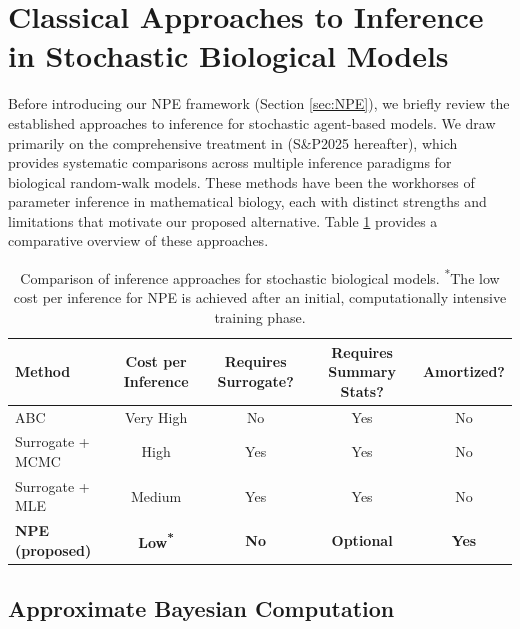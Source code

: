 \documentclass{article}
\newcommand{\SP}{S\&P2025 }
\begin{document}
\section{Classical Approaches to Inference in Stochastic Biological Models}\label{sec:classical_inference}
Before introducing our NPE framework (Section \ref{sec:NPE}), we briefly review the established approaches to inference for stochastic agent-based models. We draw primarily on the comprehensive treatment in \cite{Simpson2025.05.25.656057} (\SP hereafter), which provides systematic comparisons across multiple inference paradigms for biological random-walk models. These methods have been the workhorses of parameter inference in mathematical biology, each with distinct strengths and limitations that motivate our proposed alternative. Table \ref{tab:method_comparison} provides a comparative overview of these approaches.

\begin{table}[htbp]
	\centering
	\renewcommand{\arraystretch}{1.3} %
	\begin{tabular}{@{}lcccc@{}}
		\toprule
		\textbf{Method} & \textbf{Cost per Inference} & \textbf{Requires Surrogate?} & \textbf{Requires Summary Stats?} & \textbf{Amortized?} \\
		\midrule
		ABC & Very High & No & Yes & No \\
		Surrogate + MCMC & High & Yes & Yes & No \\
		Surrogate + MLE & Medium & Yes & Yes & No \\
		\textbf{NPE (proposed)} & \textbf{Low\textsuperscript{*}} & \textbf{No} & \textbf{Optional} & \textbf{Yes} \\
		\bottomrule
	\end{tabular}
	\vspace{0.2cm}
	\caption{Comparison of inference approaches for stochastic biological models. \textsuperscript{*}The low cost per inference for NPE is achieved after an initial, computationally intensive training phase.}
	\label{tab:method_comparison}
\end{table}





\subsection{Approximate Bayesian Computation}
\end{document}
